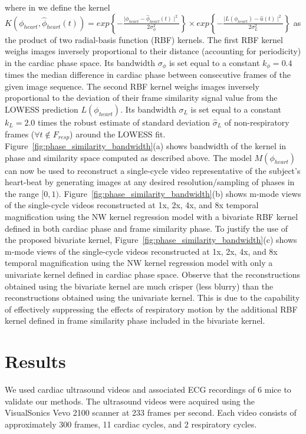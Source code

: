 \documentclass[journal]{IEEEtran}
\begin{document}
where in we define the kernel $K\left( \phi_{heart}, \hat{\phi}_{heart}(t) \right) = exp\left \{ -\frac{ \mid \phi_{heart} - \hat{\phi}_{heart}(t) \mid^2}{2  \sigma^2_\phi} \right \} \times exp\left \{ -\frac{ \mid L(\phi_{heart}) - \hat{u}(t) \mid^2}{2  \sigma^2_{L}} \right \}$ as the product of two radial-basis function (RBF) kernels. The first RBF kernel  weighs images inversely proportional to their distance (accounting for periodicity) in the cardiac phase space. Its bandwidth $\sigma_\phi$ is set equal to a constant $k_\phi = 0.4$ times the median difference in cardiac phase between consecutive frames of the given image sequence. The second RBF kernel weighs images inversely proportional to the deviation of their frame similarity signal value from the LOWESS prediction $L(\phi_{heart})$. Its bandwidth $\sigma_{L}$ is set equal to a constant $k_L = 2.0$ times the robust estimate of standard deviation $\hat{\sigma}_{L}$ of non-respiratory frames ($\forall t \notin F_{resp}$) around the LOWESS fit. Figure~\ref{fig:phase_similarity_bandwidth}(a) shows bandwidth of the kernel in phase and similarity space computed as described above. The model $M(\phi_{heart})$ can now be used to reconstruct a single-cycle video representative of the subject's heart-beat by generating images at any desired resolution/sampling of phases in the range $[0, 1)$.  Figure~\ref{fig:phase_similarity_bandwidth}(b) shows m-mode views of the single-cycle videos reconstructed at 1x, 2x, 4x, and 8x temporal magnification using the NW kernel regression model with a bivariate RBF kernel defined in both cardiac phase and frame similarity phase. To justify the use of the proposed bivariate kernel, Figure~\ref{fig:phase_similarity_bandwidth}(c) shows m-mode views of the single-cycle videos reconstructed at 1x, 2x, 4x, and 8x temporal magnification using the NW kernel regression model with only a univariate kernel defined in cardiac phase space. Observe that the reconstructions obtained using the bivariate kernel are much crisper (less blurry) than the reconstructions obtained using the univariate kernel. This is due to the capability of effectively suppressing the effects of respiratory motion by the additional RBF kernel defined in frame similarity phase included in the bivariate kernel.
%
\section{Results}
\label{sec:results}
%
We used cardiac ultrasound videos and associated ECG recordings of 6 mice to validate our methods. The ultrasound videos were acquired using the VisualSonics Vevo 2100 scanner at 233 frames per second. Each video consists of approximately 300 frames, 11 cardiac cycles, and 2 respiratory cycles.
\end{document}
